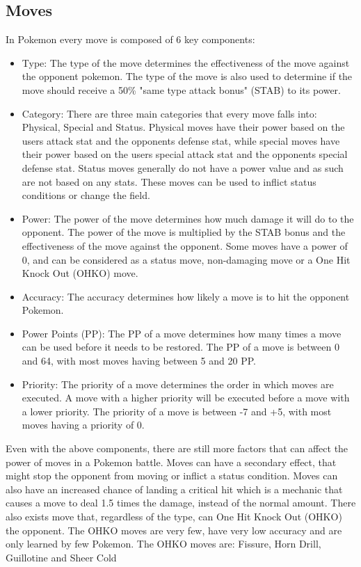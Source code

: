 \subsection{Moves}
In Pokemon every move is composed of 6 key components:
\begin{itemize}
  \item Type: The type of the move determines the effectiveness of the move against the opponent pokemon. 
    The type of the move is also used to determine if the move should receive a 50\% "same type attack bonus" (STAB) to its power.
  \item Category: There are three main categories that every move falls into: Physical, Special and Status. 
    Physical moves have their power based on the users attack stat and the opponents defense stat, while special moves have their power based on the users 
    special attack stat and the opponents special defense stat. Status moves generally do not have a power value and as such are not based on any 
    stats. These moves can be used to inflict status conditions or change the field. 
  \item Power: The power of the move determines how much damage it will do to the opponent. The power of the move is 
    multiplied by the STAB bonus and the effectiveness of the move against the opponent. Some moves have a power of 0,
    and can be considered as a status move, non-damaging move or a One Hit Knock Out (OHKO) move.
  \item Accuracy: The accuracy determines how likely a move is to hit the opponent Pokemon.
  \item Power Points (PP): The PP of a move determines how many times a move can be used before it needs to be restored.
    The PP of a move is between 0 and 64, with most moves having between 5 and 20 PP.
  \item Priority: The priority of a move determines the order in which moves are executed. A move with a higher priority 
  will be executed before a move with a lower priority. The priority of a move is between -7 and +5, 
  with most moves having a priority of 0.
\end{itemize}
Even with the above components, there are still more factors that can affect the power of moves in a Pokemon battle.
Moves can have a secondary effect, that might stop the opponent from moving or inflict a status condition. 
Moves can also have an increased chance of landing a critical hit which is a mechanic that causes a move to deal 1.5 times the damage, instead
of the normal amount. There also exists move that, regardless of the type, can One Hit Knock Out (OHKO) the opponent.
The OHKO moves are very few, have very low accuracy and are only learned by few Pokemon. The OHKO moves are: Fissure, Horn Drill, Guillotine and Sheer Cold

